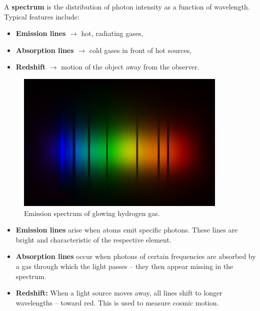 \begin{tcolorbox}[didaktikbox, title=What Does a Spectrum Show?]
	\label{box:was zeigt spektrum}
	\small
	A \textbf{spectrum} is the distribution of photon intensity as a function of wavelength. Typical features include:
	\begin{itemize}
		\item \textbf{Emission lines} $\rightarrow$ hot, radiating gases,
		\item \textbf{Absorption lines} $\rightarrow$ cold gases in front of hot sources,
		\item \textbf{Redshift} $\rightarrow$ motion of the object away from the observer.
	\end{itemize}
\end{tcolorbox}
\begin{figure}[H]
	\centering
	\includegraphics[width=0.9\textwidth]{bilder/emissionslinien.png}
	\caption{Emission spectrum of glowing hydrogen gas.}
	\label{fig:emission_hydrogen}
\end{figure}

\begin{tcolorbox}[physikbox, title=Spectral Lines and Redshift]
	\label{box:spektrallinien}
	\small
	\begin{itemize}
		\item \textbf{Emission lines} arise when atoms emit specific photons. These lines are bright and characteristic of the respective element.
		\item \textbf{Absorption lines} occur when photons of certain frequencies are absorbed by a gas through which the light passes – they then appear missing in the spectrum.
		\item \textbf{Redshift:} When a light source moves away, all lines shift to longer wavelengths – toward red. This is used to measure cosmic motion.
	\end{itemize}
\end{tcolorbox}

